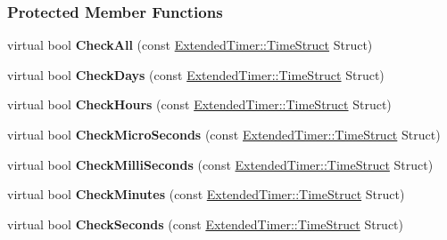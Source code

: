 \subsubsection*{Protected Member Functions}
\begin{DoxyCompactItemize}
\item 
\hypertarget{classphys_1_1ExtendedTimer_af92fcaca7cea1a2d48f7411b1b18223f}{
virtual bool {\bfseries CheckAll} (const \hyperlink{classphys_1_1ExtendedTimer_a0f316e9347d1c118a157cc3c737c554b}{ExtendedTimer::TimeStruct} Struct)}
\label{classphys_1_1ExtendedTimer_af92fcaca7cea1a2d48f7411b1b18223f}

\item 
\hypertarget{classphys_1_1ExtendedTimer_a9782d2866e39777ebfa2193460a1c457}{
virtual bool {\bfseries CheckDays} (const \hyperlink{classphys_1_1ExtendedTimer_a0f316e9347d1c118a157cc3c737c554b}{ExtendedTimer::TimeStruct} Struct)}
\label{classphys_1_1ExtendedTimer_a9782d2866e39777ebfa2193460a1c457}

\item 
\hypertarget{classphys_1_1ExtendedTimer_aee17ef0ce61f2d587ff6734ca54a5747}{
virtual bool {\bfseries CheckHours} (const \hyperlink{classphys_1_1ExtendedTimer_a0f316e9347d1c118a157cc3c737c554b}{ExtendedTimer::TimeStruct} Struct)}
\label{classphys_1_1ExtendedTimer_aee17ef0ce61f2d587ff6734ca54a5747}

\item 
\hypertarget{classphys_1_1ExtendedTimer_a4ae8b42ab14c7eb0b667968362eb9fbc}{
virtual bool {\bfseries CheckMicroSeconds} (const \hyperlink{classphys_1_1ExtendedTimer_a0f316e9347d1c118a157cc3c737c554b}{ExtendedTimer::TimeStruct} Struct)}
\label{classphys_1_1ExtendedTimer_a4ae8b42ab14c7eb0b667968362eb9fbc}

\item 
\hypertarget{classphys_1_1ExtendedTimer_ac70c02c75c9172a16dbd1dd3cdc1c554}{
virtual bool {\bfseries CheckMilliSeconds} (const \hyperlink{classphys_1_1ExtendedTimer_a0f316e9347d1c118a157cc3c737c554b}{ExtendedTimer::TimeStruct} Struct)}
\label{classphys_1_1ExtendedTimer_ac70c02c75c9172a16dbd1dd3cdc1c554}

\item 
\hypertarget{classphys_1_1ExtendedTimer_a14ed25abe8070ba5e016e9c45c6974d6}{
virtual bool {\bfseries CheckMinutes} (const \hyperlink{classphys_1_1ExtendedTimer_a0f316e9347d1c118a157cc3c737c554b}{ExtendedTimer::TimeStruct} Struct)}
\label{classphys_1_1ExtendedTimer_a14ed25abe8070ba5e016e9c45c6974d6}

\item 
\hypertarget{classphys_1_1ExtendedTimer_a2a2d9aa7baacdd86f0007510e8808db9}{
virtual bool {\bfseries CheckSeconds} (const \hyperlink{classphys_1_1ExtendedTimer_a0f316e9347d1c118a157cc3c737c554b}{ExtendedTimer::TimeStruct} Struct)}
\label{classphys_1_1ExtendedTimer_a2a2d9aa7baacdd86f0007510e8808db9}


\end{DoxyCompactItemize}
